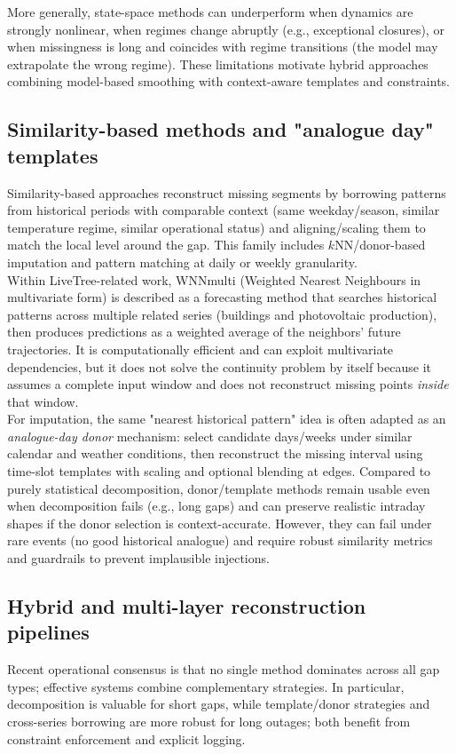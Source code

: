 More generally, state-space methods can underperform when dynamics are strongly nonlinear, when regimes change abruptly (e.g., exceptional closures), or when missingness is long and coincides with regime transitions (the model may extrapolate the wrong regime). These limitations motivate hybrid approaches combining model-based smoothing with context-aware templates and constraints.

\subsection{Similarity-based methods and "analogue day" templates}
Similarity-based approaches reconstruct missing segments by borrowing patterns from historical periods with comparable context (same weekday/season, similar temperature regime, similar operational status) and aligning/scaling them to match the local level around the gap. This family includes $k$NN/donor-based imputation and pattern matching at daily or weekly granularity.\\

Within LiveTree-related work, WNNmulti (Weighted Nearest Neighbours in multivariate form) is described as a forecasting method that searches historical patterns across multiple related series (buildings and photovoltaic production), then produces predictions as a weighted average of the neighbors' future trajectories. It is computationally efficient and can exploit multivariate dependencies, but it does not solve the continuity problem by itself because it assumes a complete input window and does not reconstruct missing points \emph{inside} that window.\\%
%

For imputation, the same "nearest historical pattern" idea is often adapted as an \emph{analogue-day donor} mechanism: select candidate days/weeks under similar calendar and weather conditions, then reconstruct the missing interval using time-slot templates with scaling and optional blending at edges. Compared to purely statistical decomposition, donor/template methods remain usable even when decomposition fails (e.g., long gaps) and can preserve realistic intraday shapes if the donor selection is context-accurate. However, they can fail under rare events (no good historical analogue) and require robust similarity metrics and guardrails to prevent implausible injections.

\subsection{Hybrid and multi-layer reconstruction pipelines}
Recent operational consensus is that no single method dominates across all gap types; effective systems combine complementary strategies. In particular, decomposition is valuable for short gaps, while template/donor strategies and cross-series borrowing are more robust for long outages; both benefit from constraint enforcement and explicit logging.\\

